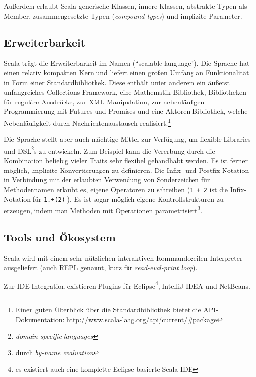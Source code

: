 \documentclass[a4paper, 12pt, listof=totoc, bibliography=totoc]{scrreprt}
\begin{document}
Außerdem erlaubt Scala generische Klassen, innere Klassen, abstrakte Typen als Member, zusammengesetzte Typen (\textit{compound types}) und implizite Parameter.\cite[S. 16 ff., S. 205 ff.]{odersky2008.PIS}\cite[S. 113 ff.]{piepmeyer2010.GFP}\cite{scala-lang2011.CSS}

\subsection{Erweiterbarkeit}

Scala trägt die Erweiterbarkeit im Namen ("`scalable language"').
Die Sprache hat einen relativ kompakten Kern und liefert einen großen Umfang an Funktionalität in Form einer Standardbibliothek. Diese enthält unter anderem ein äußerst unfangreiches Collections-Framework, eine Mathematik-Bibliothek, Bibliotheken für reguläre Ausdrücke, zur XML-Manipulation, zur nebenläufigen Programmierung mit Futures und Promises und eine Aktoren-Bibliothek, welche Nebenläufigkeit durch Nachrichtenaustausch realisiert.\footnote{Einen guten Überblick über die Standardbibliothek bietet die API-Dokumentation: \url{http://www.scala-lang.org/api/current/\#package}}

Die Sprache stellt aber auch mächtige Mittel zur Verfügung, um flexible Libraries und DSL\footnote{\textit{domain-specific languages}}s zu entwickeln. Zum Beispiel kann die Vererbung durch die Kombination beliebig vieler Traits sehr flexibel gehandhabt werden. Es ist ferner möglich, implizite Konvertierungen zu definieren. Die Infix- und Postfix-Notation in Verbindung mit der erlaubten Verwendung von Sonderzeichen für Methodennamen erlaubt es, eigene Operatoren zu schreiben (\texttt{1 + 2} ist die Infix-Notation für \texttt{1.+(2)} ). Es ist sogar möglich eigene Kontrollstrukturen zu erzeugen, indem man Methoden mit Operationen parametrisiert\footnote{
	durch \textit{by-name evaluation}}.\cite[S. 4 ff.]{odersky2008.PIS}

\subsection{Tools und Ökosystem}

Scala wird mit einem sehr nützlichen interaktiven Kommandozeilen-Interpreter ausgeliefert (auch REPL genannt, kurz für \textit{read-eval-print loop}).

Zur IDE-Integration existieren Plugins für Eclipse\footnote{
	es existiert auch eine komplette Eclipse-basierte Scala IDE}, 
IntelliJ IDEA und NetBeans.
\end{document}
